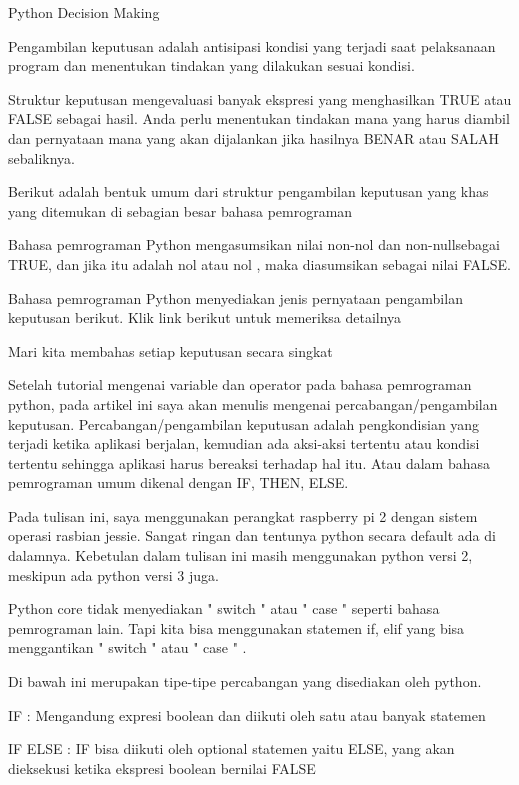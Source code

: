 
Python Decision Making 

 
Pengambilan keputusan adalah antisipasi kondisi yang terjadi saat pelaksanaan program dan menentukan tindakan yang dilakukan sesuai kondisi. 

 
Struktur keputusan mengevaluasi banyak ekspresi yang menghasilkan TRUE atau FALSE sebagai hasil.   Anda perlu menentukan tindakan mana yang harus diambil dan pernyataan mana yang akan dijalankan jika hasilnya BENAR atau SALAH sebaliknya. 

 
Berikut adalah bentuk umum dari struktur pengambilan keputusan yang khas yang ditemukan di sebagian besar bahasa pemrograman  

 
Bahasa pemrograman Python mengasumsikan nilai   non-nol   dan   non-nullsebagai TRUE, dan jika itu adalah   nol   atau   nol   , maka diasumsikan sebagai nilai FALSE. 

 
Bahasa pemrograman Python menyediakan jenis pernyataan pengambilan keputusan berikut.   Klik link berikut untuk memeriksa detailnya 

 
Mari kita membahas setiap keputusan secara singkat  

 
Setelah tutorial mengenai  
{variable dan operator}
 pada bahasa pemrograman python, pada artikel ini saya akan menulis mengenai percabangan/pengambilan keputusan. Percabangan/pengambilan keputusan adalah pengkondisian yang terjadi ketika aplikasi berjalan, kemudian ada aksi-aksi tertentu atau kondisi tertentu sehingga aplikasi harus bereaksi terhadap hal itu. Atau dalam bahasa pemrograman umum dikenal dengan IF, THEN, ELSE. 

 
Pada tulisan ini, saya menggunakan perangkat raspberry pi 2 dengan sistem operasi rasbian jessie. Sangat ringan dan tentunya python secara default ada di dalamnya. Kebetulan dalam tulisan ini masih menggunakan python versi 2, meskipun ada python versi 3 juga. 

 
Python core tidak menyediakan   " switch  "  atau   " case  "  seperti bahasa pemrograman lain. Tapi kita bisa menggunakan statemen if, elif yang bisa menggantikan   " switch  "  atau   " case  " . 

 
Di bawah ini merupakan tipe-tipe percabangan yang disediakan oleh python. 

 
IF : Mengandung expresi boolean dan diikuti oleh satu atau banyak statemen 

 
IF ELSE : IF bisa diikuti oleh optional statemen yaitu ELSE, yang akan dieksekusi ketika ekspresi boolean bernilai FALSE 

